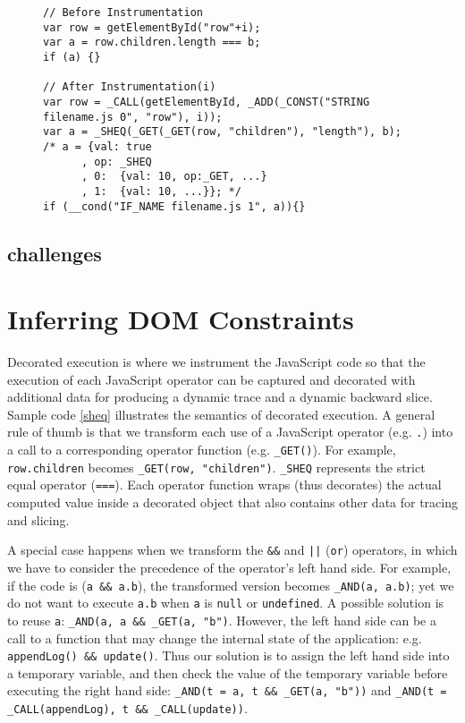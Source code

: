  






\begin{figure}
\begin{lstlisting}[caption=Example showing how code is instrumented for dynamic analysis.  The comment at line 9 shows the decorated object {\tt a} and its nested tree data structure.    
{\tt a}'s actual value is {\tt true} because both left and right hand side have the same value 10: {\tt line 11} and {\tt line 12},label=sheq]  
// Before Instrumentation
var row = getElementById("row"+i);
var a = row.children.length === b; 
if (a) {}

// After Instrumentation(i)
var row = _CALL(getElementById, _ADD(_CONST("STRING filename.js 0", "row"), i));
var a = _SHEQ(_GET(_GET(row, "children"), "length"), b);
/* a = {val: true
      , op:	_SHEQ
      , 0:	{val: 10, op:_GET, ...}
      , 1:	{val: 10, ...}}; */
if (__cond("IF_NAME filename.js 1", a)){}
\end{lstlisting}
\end{figure}

\subsection{challenges}

\section{Inferring DOM Constraints}

Decorated execution is where we instrument the JavaScript code so that the execution of each JavaScript operator can be captured and decorated with additional data for producing a dynamic trace and a dynamic backward slice.  
Sample code \ref{sheq} illustrates the semantics of decorated execution.  
A general rule of thumb is that we transform each use of a JavaScript operator (e.g. {\tt .}) into a call to a corresponding operator function (e.g. {\tt \_GET()}).  
For example, {\tt row.children} becomes {\tt \_GET(row, "children")}.  {\tt \_SHEQ} represents the strict equal operator ({\tt ===}).  
Each operator function wraps (thus decorates) the actual computed value inside a decorated object that also contains other data for tracing and slicing.   

A special case happens when we transform the {\tt \&\&} and {\tt |}{\tt |} ({\tt or}) operators, in which we have to consider the precedence of the operator's left hand side.   
For example, if the code is ({\tt a \&\& a.b}), the transformed version becomes {\tt \_AND(a, a.b)}; yet we do not want to execute {\tt a.b} when {\tt a} is {\tt null} or {\tt undefined}.  
A possible solution is to reuse {\tt a}: {\tt \_AND(a, a \&\& \_GET(a, "b")}.  
However, the left hand side can be a call to a function that may change the internal state of the application: e.g. {\tt appendLog() \&\& update()}.
Thus our solution is to assign the left hand side into a temporary variable, and then check the value of the temporary variable before executing the right hand side: 
{\tt \_AND(t = a, t \&\& \_GET(a, "b"))} and {\tt \_AND(t = \_CALL(appendLog), t \&\& \_CALL(update))}.  

